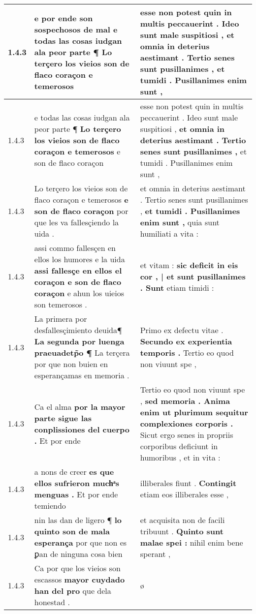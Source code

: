 \begin{tabular}{|p{1cm}|p{6.5cm}|p{6.5cm}|}
1.4.3 & e por ende son sospechosos de mal \textbf{ e todas las cosas iudgan ala peor parte ¶ } Lo terçero los vieios son de flaco coraçon e temerosos & esse non potest quin in multis peccauerint . Ideo sunt male suspitiosi , \textbf{ et omnia in deterius aestimant . Tertio senes sunt pusillanimes , } et tumidi . Pusillanimes enim sunt , \\\hline
1.4.3 & e todas las cosas iudgan ala peor parte ¶ \textbf{ Lo terçero los vieios son de flaco coraçon e temerosos } e son de flaco coraçon & esse non potest quin in multis peccauerint . Ideo sunt male suspitiosi , \textbf{ et omnia in deterius aestimant . Tertio senes sunt pusillanimes , } et tumidi . Pusillanimes enim sunt , \\\hline
1.4.3 & Lo terçero los vieios son de flaco coraçon e temerosos \textbf{ e son de flaco coraçon } por que les va fallesçiendo la uida . & et omnia in deterius aestimant . Tertio senes sunt pusillanimes , \textbf{ et tumidi . Pusillanimes enim sunt , } quia sunt humiliati a vita : \\\hline
1.4.3 & assi commo fallesçen en ellos los humores e la uida \textbf{ assi fallesçe en ellos el coraçon e son de flaco coraçon } e ahun los uieios son temerosos . & et vitam : \textbf{ sic deficit in eis cor , | et sunt pusillanimes . Sunt } etiam timidi : \\\hline
1.4.3 & La primera por desfallesçimiento deuida¶ \textbf{ La segunda por luenga praeuadetp̃o ¶ } La terçera por que non buien en esperançamas en memoria . & Primo ex defectu vitae . \textbf{ Secundo ex experientia temporis . } Tertio eo quod non viuunt spe , \\\hline
1.4.3 & Ca el alma \textbf{ por la mayor parte sigue las conplissiones del cuerpo . } Et por ende & Tertio eo quod non viuunt spe , \textbf{ sed memoria . Anima enim ut plurimum sequitur complexiones corporis . } Sicut ergo senes in propriis corporibus deficiunt in humoribus , et in vita : \\\hline
1.4.3 & a nons de creer \textbf{ es que ellos sufrieron muchͣs menguas . } Et por ende temiendo & illiberales fiunt . \textbf{ Contingit } etiam eos illiberales esse , \\\hline
1.4.3 & nin las dan de ligero ¶ \textbf{ lo quinto son de mala esperança } por que non es ꝑan de ninguna cosa bien & et acquisita non de facili tribuunt . \textbf{ Quinto sunt malae spei : } nihil enim bene sperant , \\\hline
1.4.3 & Ca por que los vieios son escassos \textbf{ mayor cuydado han del pro } que dela honestad . & ø \\\hline

\end{tabular}
